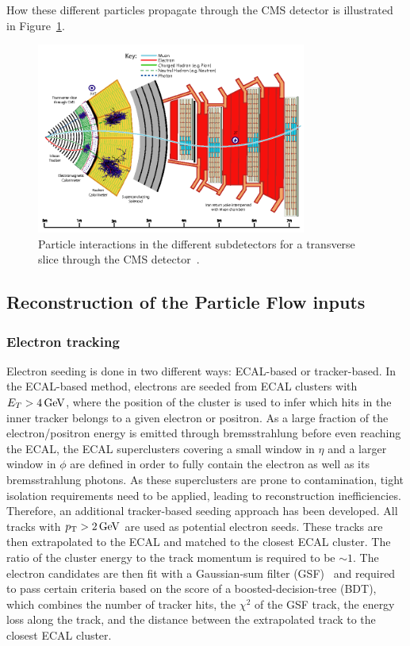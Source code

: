 How these different particles propagate through the CMS detector is illustrated in Figure~\ref{fig:objreco:PF}.
\begin{figure}[h!] 
    \centering
    \includegraphics[width=0.79\textwidth]{figures/event_reconstruction/PF.png}
    \caption{Particle interactions in the different subdetectors for a transverse slice through the CMS detector~\cite{1748-0221-12-10-P10003}.}
    \label{fig:objreco:PF}
\end{figure} 

\subsection{Reconstruction of the Particle Flow inputs}

\subsubsection{Electron tracking}
\label{subsub:objreco:electrontracking}
Electron seeding is done in two different ways: ECAL-based  or tracker-based. In the ECAL-based method, electrons are seeded from  ECAL clusters with $E_T > 4 \,\text{Ge\hspace{-.08em}V}$, where the position of the cluster is used to infer which hits in the inner tracker belongs to a given electron or positron. As a large fraction of the electron/positron energy is emitted through bremsstrahlung before even reaching the ECAL, the ECAL superclusters covering a small window in $\eta$ and a larger window in $\phi$ are defined in order to fully contain the electron as well as its bremsstrahlung photons. As these superclusters are prone to contamination, tight isolation requirements need to be applied, leading to reconstruction inefficiencies. Therefore, an additional tracker-based seeding approach has been developed. All tracks with $p_{\mathrm{T}}>2\,\text{Ge\hspace{-.08em}V}$ are used as potential electron seeds. These tracks are then extrapolated to the ECAL and matched to the closest ECAL cluster. The ratio of the cluster energy to the track momentum is required to be $\sim 1$. The electron candidates are then fit with a Gaussian-sum filter (GSF)~\cite{0954-3899-31-9-N01} and required to pass certain criteria based on the score of a boosted-decision-tree (BDT), which combines the number of tracker hits, the $\chi^2$ of the GSF track, the energy loss along the  track, and the distance between the extrapolated track to the closest ECAL cluster.


